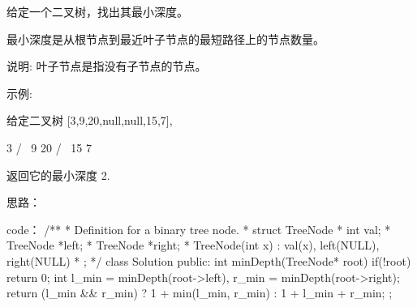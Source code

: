 给定一个二叉树，找出其最小深度。

最小深度是从根节点到最近叶子节点的最短路径上的节点数量。

说明: 叶子节点是指没有子节点的节点。

示例:

给定二叉树 [3,9,20,null,null,15,7],

    3
   / \
  9  20
    /  \
   15   7

返回它的最小深度  2.

































思路：
























code：
/**
 * Definition for a binary tree node.
 * struct TreeNode {
 *     int val;
 *     TreeNode *left;
 *     TreeNode *right;
 *     TreeNode(int x) : val(x), left(NULL), right(NULL) {}
 * };
 */
class Solution {
public:
    int minDepth(TreeNode* root) {
        if(!root) return 0;
        int l_min = minDepth(root->left), r_min = minDepth(root->right);
        return (l_min && r_min) ? 1 + min(l_min, r_min) : 1 + l_min + r_min;
    }
};